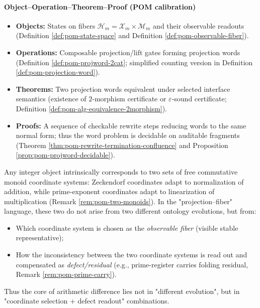 \paragraph{Object–Operation–Theorem–Proof (POM calibration)}
\begin{itemize}
  \item \textbf{Objects:} States on fibers \(\mathcal{H}_m=\mathcal{X}_m\times \mathcal{M}_m\) and their observable readouts (Definition \ref{def:pom-state-space} and Definition \ref{def:pom-observable-fiber}).
  \item \textbf{Operations:} Composable projection/lift gates forming projection words (Definition \ref{def:pom-projword-2cat}; simplified counting version in Definition \ref{def:pom-projection-word}).
  \item \textbf{Theorems:} Two projection words equivalent under selected interface semantics (existence of \(2\)-morphism certificate or \(\varepsilon\)-sound certificate; Definition \ref{def:pom-alg-equivalence-2morphism}).
  \item \textbf{Proofs:} A sequence of checkable rewrite steps reducing words to the same normal form; thus the word problem is decidable on auditable fragments (Theorem \ref{thm:pom-rewrite-termination-confluence} and Proposition \ref{prop:pom-projword-decidable}).
\end{itemize}

\begin{remark}\label{rem:pom-coordinate-defect-principle}
Any integer object intrinsically corresponds to two sets of free commutative monoid coordinate systems:
Zeckendorf coordinates adapt to normalization of addition, while prime-exponent coordinates adapt to linearization of multiplication (Remark \ref{rem:pom-two-monoids}).
In the "projection–fiber" language, these two do not arise from two different ontology evolutions, but from:
\begin{itemize}
  \item Which coordinate system is chosen as the \emph{observable fiber} (visible stable representative);
  \item How the inconsistency between the two coordinate systems is read out and compensated as \emph{defect/residual} (e.g., prime-register carries folding residual, Remark \ref{rem:pom-prime-carry}).
\end{itemize}
Thus the core of arithmetic difference lies not in "different evolution", but in "coordinate selection + defect readout" combinations.
\end{remark}

